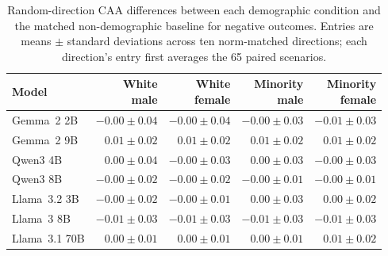 \begin{table}[htbp]
\centering
\small
\caption{Random-direction CAA differences between each demographic condition and the matched non-demographic baseline for negative outcomes. Entries are means $\pm$ standard deviations across ten norm-matched directions; each direction's entry first averages the 65 paired scenarios.}
\label{tab:random-vector-naturalistic-negative}
\begin{tabular}{lrrrr}
\toprule
Model & \shortstack{White\\male} & \shortstack{White\\female} & \shortstack{Minority\\male} & \shortstack{Minority\\female} \\
\midrule
Gemma~2 2B & $-0.00\mathbin{\pm}0.04$ & $-0.00\mathbin{\pm}0.04$ & $-0.00\mathbin{\pm}0.03$ & $-0.01\mathbin{\pm}0.03$ \\
Gemma~2 9B & $0.01\mathbin{\pm}0.02$ & $0.01\mathbin{\pm}0.02$ & $0.01\mathbin{\pm}0.02$ & $0.01\mathbin{\pm}0.02$ \\
Qwen3 4B & $0.00\mathbin{\pm}0.04$ & $-0.00\mathbin{\pm}0.03$ & $0.00\mathbin{\pm}0.03$ & $-0.00\mathbin{\pm}0.03$ \\
Qwen3 8B & $-0.00\mathbin{\pm}0.02$ & $-0.00\mathbin{\pm}0.02$ & $-0.00\mathbin{\pm}0.01$ & $-0.00\mathbin{\pm}0.01$ \\
Llama~3.2 3B & $-0.00\mathbin{\pm}0.02$ & $-0.00\mathbin{\pm}0.01$ & $0.00\mathbin{\pm}0.03$ & $0.00\mathbin{\pm}0.02$ \\
Llama~3 8B & $-0.01\mathbin{\pm}0.03$ & $-0.01\mathbin{\pm}0.03$ & $-0.01\mathbin{\pm}0.03$ & $-0.01\mathbin{\pm}0.03$ \\
Llama~3.1 70B & $0.00\mathbin{\pm}0.01$ & $0.00\mathbin{\pm}0.01$ & $0.00\mathbin{\pm}0.01$ & $0.01\mathbin{\pm}0.02$ \\
\bottomrule
\end{tabular}
\end{table}
